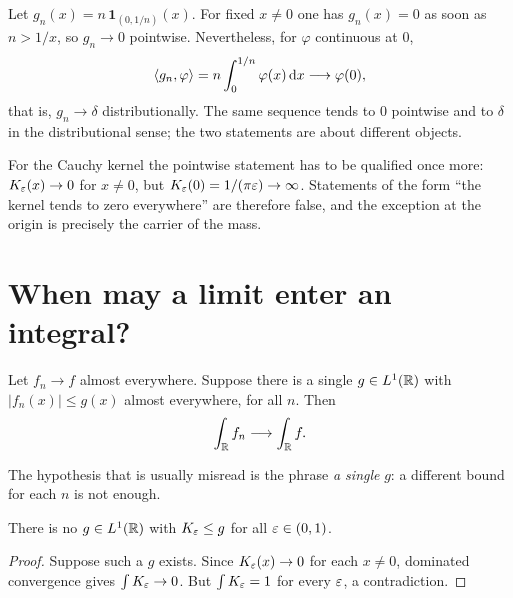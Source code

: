 \begin{example}\label{ex:delta-limit}
Let $g_{n}(x)=n\,\mathbf{1}_{(0,1/n)}(x)$. For fixed $x\neq0$ one has $g_{n}(x)=0$ as soon as
$n>1/x$, so $g_{n}\to0$ pointwise. Nevertheless, for $\varphi$ continuous at $0$,
\begin{equation}
\langle g_{n},\varphi\rangle=n\int_{0}^{1/n}\varphi(x)\,\mathrm{d} x\longrightarrow\varphi(0),
\end{equation}
that is, $g_{n}\to\delta$ distributionally. The same sequence tends to $0$ pointwise and to
$\delta$ in the distributional sense; the two statements are about different objects.
\end{example}

\begin{remark}
For the Cauchy kernel the pointwise statement has to be qualified once more: $K_{\varepsilon}(x)\to0$ for
$x\neq0$, but $K_{\varepsilon}(0)=1/(\pi\varepsilon)\to\infty$. Statements of the form ``the kernel tends to zero
everywhere'' are therefore false, and the exception at the origin is precisely the carrier of the
mass.
\end{remark}

\section{When may a limit enter an integral?}

\begin{theorem}\label{thm:DCT}
Let $f_{n}\to f$ almost everywhere. Suppose there is a single $g\in L^{1}(\mathbb{R})$ with
$|f_{n}(x)|\le g(x)$ almost everywhere, for all $n$. Then
\begin{equation}
\int_{\mathbb{R}}f_{n}\longrightarrow\int_{\mathbb{R}}f .
\end{equation}
\end{theorem}

The hypothesis that is usually misread is the phrase \emph{a single} $g$: a different bound for each
$n$ is not enough.

\begin{proposition}\label{prop:nodominator}
There is no $g\in L^{1}(\mathbb{R})$ with $K_{\varepsilon}\le g$ for all $\varepsilon\in(0,1)$.
\end{proposition}

\begin{proof}
Suppose such a $g$ exists. Since $K_{\varepsilon}(x)\to0$ for each $x\neq0$, dominated convergence gives
$\int K_{\varepsilon}\to0$. But $\int K_{\varepsilon}=1$ for every $\varepsilon$, a contradiction.
\end{proof}

